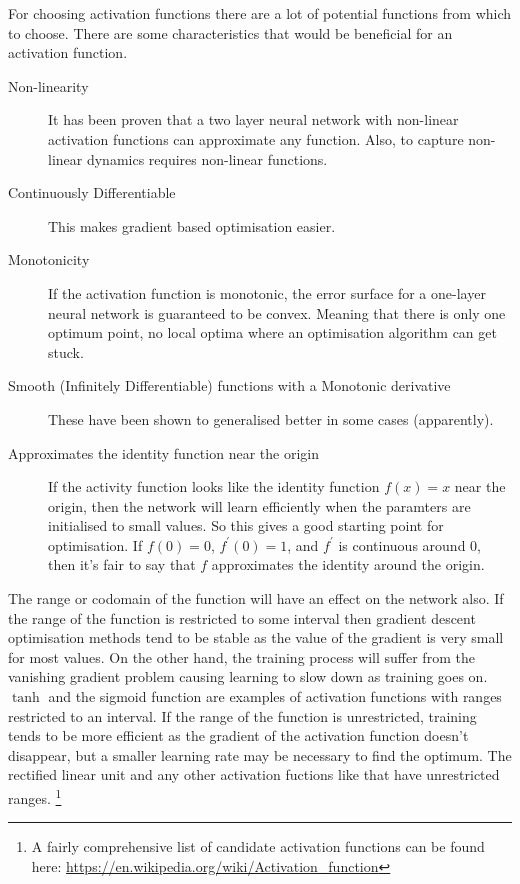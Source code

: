 \documentclass[a4paper,12pt]{article}
\theoremstyle{definition}
\begin{document}
For choosing activation functions there are a lot of potential functions from which to choose. There are some characteristics that would be beneficial for an activation function.
\begin{description}
	\item[Non-linearity] It has been proven that a two layer neural network with non-linear activation functions can approximate any function. Also, to capture non-linear dynamics requires non-linear functions.
	\item[Continuously Differentiable] This makes gradient based optimisation easier. 
	\item[Monotonicity] If the activation function is monotonic, the error surface for a one-layer neural network is guaranteed to be convex. Meaning that there is only one optimum point, no local optima where an optimisation algorithm can get stuck.
	\item[Smooth (Infinitely Differentiable) functions with a Monotonic derivative] These have been shown to generalised better in some cases (apparently).
	\item[Approximates the identity function near the origin] If the activity function looks like the identity function $f(x) = x$ near the origin, then the network will learn efficiently when the paramters are initialised to small values. So this gives a good starting point for optimisation. If $f(0) = 0$, $f^{\prime}(0) = 1$, and $f^{\prime}$ is continuous around 0, then it's fair to say that $f$ approximates the identity around the origin.
\end{description}

The range or codomain of the function will have an effect on the network also. If the range of the function is restricted to some interval then gradient descent optimisation methods tend to be stable as the value of the gradient is very small for most values. On the other hand, the training process will suffer from the vanishing gradient problem causing learning to slow down as training goes on. $\tanh$ and the sigmoid function are examples of activation functions with ranges restricted to an interval. If the range of the function is unrestricted, training tends to be more efficient as the gradient of the activation function doesn't disappear, but a smaller learning rate may be necessary to find the optimum. The rectified linear unit and any other activation fuctions like that have unrestricted ranges. \footnote{A fairly comprehensive list of candidate activation functions can be found here: \url{https://en.wikipedia.org/wiki/Activation_function}}
\end{document}
